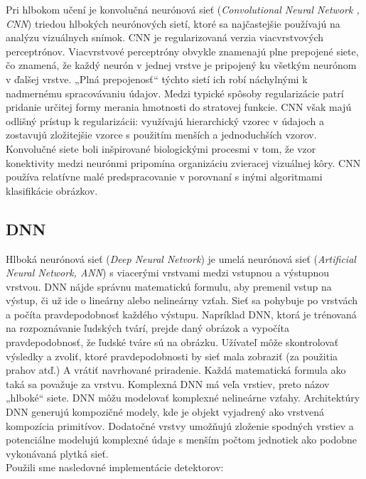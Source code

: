 \documentclass[]{article}
\begin{document}
	Pri hlbokom učení je konvolučná neurónová sieť (\textit{Convolutional Neural Network , CNN}) triedou hlbokých neurónových sietí, ktoré sa najčastejšie používajú na analýzu vizuálnych snímok. CNN je regularizovaná verzia viacvrstvových perceptrónov. Viacvrstvové perceptróny obvykle znamenajú plne prepojené siete, čo znamená, že každý neurón v jednej vrstve je pripojený ku všetkým neurónom v ďalšej vrstve. „Plná prepojenosť“ týchto sietí ich robí náchylnými k nadmernému spracovávaniu údajov. Medzi typické spôsoby regularizácie patrí pridanie určitej formy merania hmotnosti do stratovej funkcie. CNN však majú odlišný prístup k regularizácii: využívajú hierarchický vzorec v údajoch a zostavujú zložitejšie vzorce s použitím menších a jednoduchších vzorov. Konvolučné siete boli inšpirované biologickými procesmi v tom, že vzor konektivity medzi neurónmi pripomína organizáciu zvieracej vizuálnej kôry. CNN používa relatívne malé predspracovanie v porovnaní s inými algoritmami klasifikácie obrázkov.
	
	\subsection*{DNN}
	
	Hlboká neurónová sieť (\textit{Deep Neural Netvork}) je umelá neurónová sieť (\textit{Artificial Neural Network, ANN}) s viacerými vrstvami medzi vstupnou a výstupnou vrstvou. DNN nájde správnu matematickú formulu, aby premenil vstup na výstup, či už ide o lineárny alebo nelineárny vzťah. Sieť sa pohybuje po vrstvách a počíta pravdepodobnosť každého výstupu. Napríklad DNN, ktorá je trénovaná na rozpoznávanie ľudských tvárí, prejde daný obrázok a vypočíta pravdepodobnosť, že ľudské tváre sú na obrázku. Užívateľ môže skontrolovať výsledky a zvoliť, ktoré pravdepodobnosti by sieť mala zobraziť (za použitia prahov atď.) A vrátiť navrhované priradenie. Každá matematická formula ako taká sa považuje za vrstvu. Komplexná DNN má veľa vrstiev, preto názov „hlboké“ siete.
	DNN môžu modelovať komplexné nelineárne vzťahy. Architektúry DNN generujú kompozičné modely, kde je objekt vyjadrený ako vrstvená kompozícia primitívov. Dodatočné vrstvy umožňujú zloženie spodných vrstiev a potenciálne modelujú komplexné údaje s menším počtom jednotiek ako podobne vykonávaná plytká sieť.\\
	
	\newpage
	Použili sme nasledovné implementácie detektorov: 
	
\end{document}
